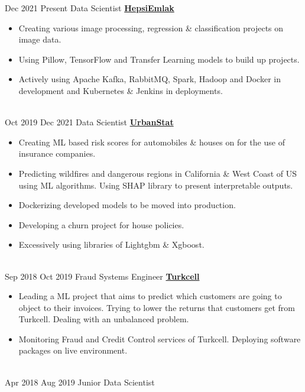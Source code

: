 \documentclass[letterpaper]{DS_class_file} %
\begin{document}
\begin{twenty}
    \twentyitem
		{Dec 2021}
		{Present}
		{\hspace{0.3cm}Data Scientist}
		{\href{https://www.hepsiemlak.com/}{\textbf{HepsiEmlak}}}
		{}
		{\begin{itemize}
			\item Creating various image processing, regression \& classification projects on image data.
			\item Using Pillow, TensorFlow and Transfer Learning models to build up projects.
			\item Actively using Apache Kafka, RabbitMQ, Spark, Hadoop and Docker in development and Kubernetes \& Jenkins in deployments.
		\end{itemize}}
		\\
	\twentyitem
		{Oct 2019}
		{Dec 2021}
		{\hspace{0.3cm}Data Scientist}
		{\href{https://www.urbanstat.com/}{\textbf{UrbanStat}}}
		{}
		{\begin{itemize}
			\item Creating ML based risk scores for automobiles \& houses on for the use of insurance companies.
			\item Predicting wildfires and dangerous regions in California \& West Coast of US using ML algorithms. Using SHAP library to present interpretable outputs.
			\item Dockerizing developed models to be moved into production.
			\item Developing a churn project for house policies.
			\item Excessively using libraries of Lightgbm \& Xgboost.
		\end{itemize}}
		\\
	\twentyitem
		{Sep 2018}
		{Oct 2019}
		{\hspace{0.3cm}Fraud Systems Engineer}
		{\href{https://www.turkcell.com.tr/}{\textbf{Turkcell}}}
		{}
		{\begin{itemize}
			\item Leading a ML project that aims to predict which customers are going to object to their invoices. Trying to lower the returns that customers get from Turkcell. Dealing with an unbalanced problem.
			\item Monitoring Fraud and Credit Control services of Turkcell. Deploying software packages on live environment.
		\end{itemize}}
		\\
	\twentyitem
		{Apr 2018}
		{Aug 2019}
		{\hspace{0.3cm}Junior Data Scientist}

\end{twenty}
\end{document}
